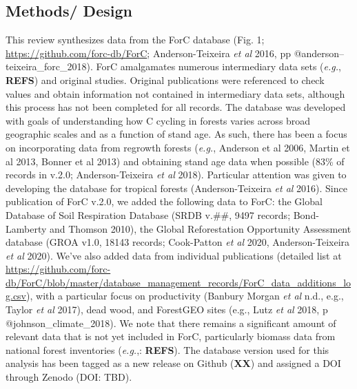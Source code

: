 \documentclass[
]{article}
\begin{document}
\hypertarget{methods-design}{%
\subsection{Methods/ Design}\label{methods-design}}

This review synthesizes data from the ForC database (Fig. 1;
\url{https://github.com/forc-db/ForC}; Anderson-Teixeira \emph{et al}
2016, pp @anderson--teixeira\_forc\_2018). ForC amalgamates numerous
intermediary data sets (\emph{e.g.}, \textbf{REFS}) and original
studies. Original publications were referenced to check values and
obtain information not contained in intermediary data sets, although
this process has not been completed for all records. The database was
developed with goals of understanding how C cycling in forests varies
across broad geographic scales and as a function of stand age. As such,
there has been a focus on incorporating data from regrowth forests
(\emph{e.g.}, Anderson et al 2006, Martin et al 2013, Bonner et al 2013)
and obtaining stand age data when possible (83\% of records in v.2.0;
Anderson-Teixeira \emph{et al} 2018). Particular attention was given to
developing the database for tropical forests (Anderson-Teixeira \emph{et
al} 2016). Since publication of ForC v.2.0, we added the following data
to ForC: the Global Database of Soil Respiration Database (SRDB v.\#\#,
9497 records; Bond-Lamberty and Thomson 2010), the Global Reforestation
Opportunity Assessment database (GROA v1.0, 18143 records; Cook-Patton
\emph{et al} 2020, Anderson-Teixeira \emph{et al} 2020). We've also
added data from individual publications (detailed list at
\url{https://github.com/forc-db/ForC/blob/master/database_management_records/ForC_data_additions_log.csv}),
with a particular focus on productivity (Banbury Morgan \emph{et al}
n.d., e.g., Taylor \emph{et al} 2017), dead wood, and ForestGEO sites
(e.g., Lutz \emph{et al} 2018, p @johnson\_climate\_2018). We note that
there remains a significant amount of relevant data that is not yet
included in ForC, particularly biomass data from national forest
inventories (\emph{e.g.},: \textbf{REFS}). The database version used for
this analysis has been tagged as a new release on Github (\textbf{XX})
and assigned a DOI through Zenodo (DOI: TBD).
\end{document}
